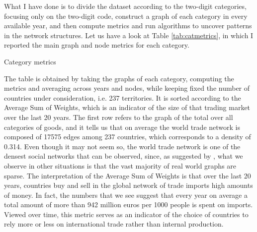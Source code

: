 What I have done is to divide the dataset according to the two-digit categories, focusing only on the two-digit code, construct a graph of each category in every available year, and then compute metrics and run algorithms to uncover patterns in the network structures.
Let us have a look at Table \ref{tab:catmetrics}, in which I reported the main graph and node metrics for each category.

\begin{landscape}
\begin{table}
    
    \caption{Category metrics}
    \label{tab:catmetrics}
\end{table}

\end{landscape}

The table is obtained by taking the graphs of each category, computing the metrics and averaging across years and nodes, while keeping fixed the number of countries under consideration, i.e. 237 territories.
It is sorted according to the Average Sum of Weights, which is an indicator of the size of that trading market over the last 20 years. The first row refers to the graph of the total over all categories of goods, and it tells us that on average the world trade network is composed of 17575 edges among 237 countries, which corresponds to a density of 0.314. Even though it may not seem so, the world trade network is one of the densest social networks that can be observed, since, as suggested by \textcite{barabasi2016network}, what we observe in other situations is that the vast majority of real world graphs are sparse. The interpretation of the Average Sum of Weights is that over the last 20 years, countries buy and sell in the global network of trade imports high amounts of money. In fact, the numbers that we see suggest that every year on average a total amount of more than 942 million euros per 1000 people is spent on imports. Viewed over time, this metric serves as an indicator of the choice of countries to rely more or less on international trade rather than internal production.
